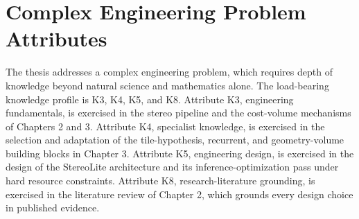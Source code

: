 \section{Complex Engineering Problem Attributes}
The thesis addresses a complex engineering problem, which requires depth
of knowledge beyond natural science and mathematics alone. The
load-bearing knowledge profile is K3, K4, K5, and K8. Attribute K3,
engineering fundamentals, is exercised in the stereo pipeline and the
cost-volume mechanisms of Chapters 2 and 3. Attribute K4, specialist
knowledge, is exercised in the selection and adaptation of the
tile-hypothesis, recurrent, and geometry-volume building blocks in
Chapter 3. Attribute K5, engineering design, is exercised in the design
of the StereoLite architecture and its inference-optimization pass under
hard resource constraints. Attribute K8, research-literature grounding, is
exercised in the literature review of Chapter 2, which grounds every
design choice in published evidence.

